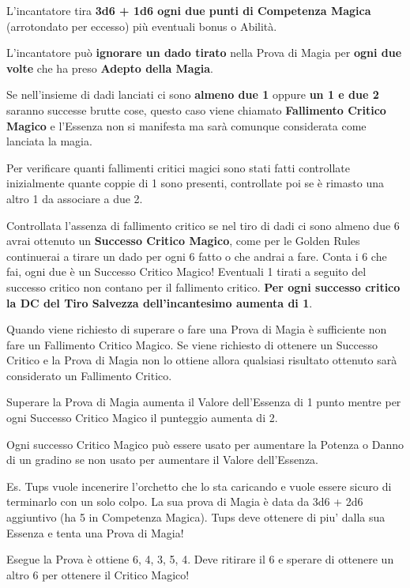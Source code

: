 \documentclass[a4paper,twoside,openany]{book}
\begin{document}
\begin{multicols}{2}
L'incantatore tira \textbf{3d6 + 1d6 ogni due punti di Competenza Magica} (arrotondato per eccesso) più eventuali bonus o Abilità.

L'incantatore può \textbf{ignorare un dado tirato} nella Prova di Magia per \textbf{ogni due volte} che ha preso \textbf{Adepto della Magia}.

Se nell'insieme di dadi lanciati ci sono \textbf{almeno due 1} oppure \textbf{un 1 e due 2} saranno successe brutte cose, questo caso viene chiamato \textbf{Fallimento Critico Magico} e l'Essenza non si manifesta ma sarà comunque considerata come lanciata la magia.

Per verificare quanti fallimenti critici magici sono stati fatti controllate inizialmente quante coppie di 1 sono presenti, controllate poi se è rimasto una altro 1 da associare a due 2.

Controllata l'assenza di fallimento critico se nel tiro di dadi ci sono almeno due 6 avrai ottenuto un \textbf{Successo Critico Magico}, come per le Golden Rules continuerai a tirare un dado per ogni 6 fatto o che andrai a fare. Conta i 6 che fai, ogni due è un Successo Critico Magico! Eventuali 1 tirati a seguito del successo critico non contano per il fallimento critico. \textbf{Per ogni successo critico la DC del Tiro Salvezza dell'incantesimo aumenta di 1}.

Quando viene richiesto di superare o fare una Prova di Magia è sufficiente non fare un Fallimento Critico Magico. Se viene richiesto di ottenere un Successo Critico e la Prova di Magia non lo ottiene allora qualsiasi risultato ottenuto sarà considerato un Fallimento Critico.

Superare la Prova di Magia aumenta il Valore dell'Essenza di 1 punto mentre per ogni Successo Critico Magico il punteggio aumenta di 2.

Ogni successo Critico Magico può essere usato per aumentare la Potenza o Danno di un gradino se non usato per aumentare il Valore dell'Essenza.

Es. Tups vuole incenerire l'orchetto che lo sta caricando e vuole essere sicuro di terminarlo con un solo colpo. La sua prova di Magia è data da 3d6 + 2d6 aggiuntivo (ha 5 in Competenza Magica). Tups deve ottenere di piu' dalla sua Essenza e tenta una Prova di Magia!

Esegue la Prova è ottiene 6, 4, 3, 5, 4. Deve ritirare il 6 e sperare di ottenere un altro 6 per ottenere il Critico Magico!


\end{multicols}
\end{document}
